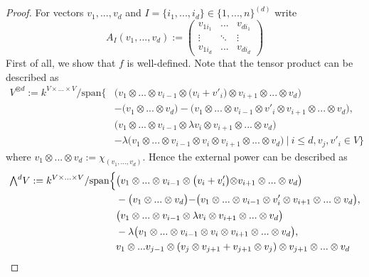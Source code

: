 \documentclass{scrartcl}
\newcommand{\extpow}{\mathchoice{{\textstyle\bigwedge}}
    {{\bigwedge}}
    {{\textstyle\wedge}}
    {{\scriptstyle\wedge}}}
\newcommand{\vspan}{\mathrm{span}}
\theoremstyle{definition}
\begin{document}
\begin{proof}
    For vectors $v_1, ..., v_d$ and $I = \{i_1, ..., i_d\} \in \{1, ..., n\}^{(d)}$ write
    \begin{equation*}
        A_I(v_1, ..., v_d) := \left(\begin{matrix*}
            v_{1i_1} & ... & v_{di_1} \\
            \vdots & \ddots & \vdots \\
            v_{1i_d} & ... & v_{di_d}
        \end{matrix*}\right)
    \end{equation*}
    First of all, we show that $f$ is well-defined.
    Note that the tensor product can be described as
    \begin{align*}
        V^{\otimes d} := k^{V \times ...\times V} / \vspan\{ &\bigl(v_1 \otimes ... \otimes v_{i - 1} \otimes \bigl(v_i + v'_i\bigl) \otimes v_{i + 1} \otimes ... \otimes v_d\bigl) \\
        &- \bigl(v_1 \otimes ... \otimes v_d\bigl) - \bigl(v_1 \otimes ... \otimes v_{i - 1} \otimes v'_i \otimes v_{i + 1} \otimes ... \otimes v_d\bigl), \\
        & \bigl(v_1 \otimes ... \otimes v_{i - 1} \otimes \lambda v_i \otimes v_{i + 1} \otimes ... \otimes v_d\bigl) \\
        &- \lambda\bigl(v_1 \otimes ... \otimes v_{i - 1} \otimes v_i \otimes v_{i + 1} \otimes ... \otimes v_d\bigl) \ | \ i \leq d, v_j, v'_i \in V\}
    \end{align*}
    where $v_1 \otimes ... \otimes v_d := \chi_{(v_1, ..., v_d)}$.
    Hence the external power can be described as
    \begin{align*}
        \extpow^d V := k^{V \times ... \times V} / \vspan\Bigl\{ &\bigl(v_1 \otimes ... \otimes v_{i - 1} \otimes \bigl(v_i + v'_i\bigl) \otimes v_{i + 1} \otimes ... \otimes v_d\bigl) \\
        &- \bigl(v_1 \otimes ... \otimes v_d\bigl) - \bigl(v_1 \otimes ... \otimes v_{i - 1} \otimes v'_i \otimes v_{i + 1} \otimes ... \otimes v_d\bigl), \\
        & \bigl(v_1 \otimes ... \otimes v_{i - 1} \otimes \lambda v_i \otimes v_{i + 1} \otimes ... \otimes v_d\bigl) \\
        &- \lambda\bigl(v_1 \otimes ... \otimes v_{i - 1} \otimes v_i \otimes v_{i + 1} \otimes ... \otimes v_d\bigl), \\
        &v_1 \otimes ... v_{j - 1} \otimes (v_j \otimes v_{j + 1} + v_{j + 1} \otimes v_j) \otimes v_{j + 1} \otimes ... \otimes v_d \\

\end{align*}
\end{proof}
\end{document}
